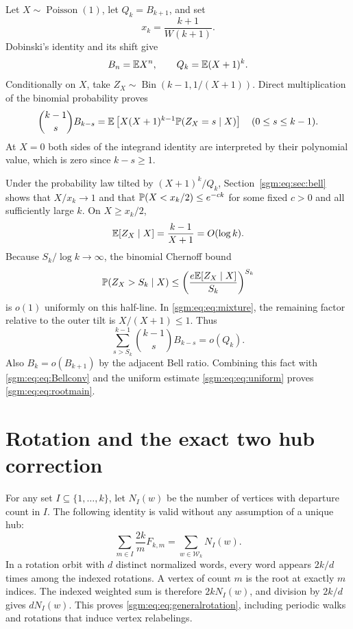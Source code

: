 \documentclass[11pt,letterpaper]{article}
\theoremstyle{remark}\newtheorem{remark}[theorem]{Remark}
\newcommand{\Wc}{\mathcal W}\newcommand{\Uc}{\mathcal U}\newcommand{\Part}{\operatorname{Part}}
\newcommand{\Poi}{\operatorname{Poisson}}\newcommand{\Bin}{\operatorname{Bin}}
\theoremstyle{definition}\newtheorem{definition}[theorem]{Definition}
\begin{document}
Let $X\sim\Poi(1)$, let $Q_k=B_{k+1}$, and set
\[
 x_k=\frac{k+1}{W(k+1)}.
\]
Dobinski's identity and its shift give
\begin{equation}\label{sgm:eq:eq:shifted}
 B_n=\mathbb E X^n,\qquad Q_k=\mathbb E(X+1)^k.
\end{equation}
Conditionally on $X$, take $Z_X\sim\Bin(k-1,1/(X+1))$. Direct multiplication of the binomial probability proves
\begin{equation}\label{sgm:eq:eq:mixture}
 \binom{k-1}{s}B_{k-s}
 =\mathbb E\left[X(X+1)^{k-1}\mathbb P(Z_X=s\mid X)\right]
 \quad(0\le s\le k-1).
\end{equation}
At $X=0$ both sides of the integrand identity are interpreted by their polynomial value, which is zero since $k-s\ge1$.

Under the probability law tilted by $(X+1)^k/Q_k$, Section~\ref{sgm:eq:sec:bell} shows that $X/x_k\to1$ and that $\mathbb P(X<x_k/2)\le e^{-c k}$ for some fixed $c>0$ and all sufficiently large $k$. On $X\ge x_k/2$,
\[
 \mathbb E[Z_X\mid X]=\frac{k-1}{X+1}=O(\log k).
\]
Because $S_k/\log k\to\infty$, the binomial Chernoff bound
\[
 \mathbb P(Z_X>S_k\mid X)
 \le\left(\frac{e\mathbb E[Z_X\mid X]}{S_k}\right)^{S_k}
\]
is $o(1)$ uniformly on this half-line. In \eqref{sgm:eq:eq:mixture}, the remaining factor relative to the outer tilt is $X/(X+1)\le1$. Thus
\[
 \sum_{s>S_k}^{k-1}\binom{k-1}{s}B_{k-s}=o(Q_k).
\]
Also $B_k=o(B_{k+1})$ by the adjacent Bell ratio. Combining this fact with \eqref{sgm:eq:eq:Bellconv} and the uniform estimate \eqref{sgm:eq:eq:uniform} proves \eqref{sgm:eq:eq:rootmain}.

\section{Rotation and the exact two hub correction}\label{sgm:eq:sec:rotation}
For any set $I\subseteq\{1,\ldots,k\}$, let $N_I(w)$ be the number of vertices with departure count in $I$. The following identity is valid without any assumption of a unique hub:
\begin{equation}\label{sgm:eq:eq:generalrotation}
 \sum_{m\in I}\frac{2k}{m}F_{k,m}=\sum_{w\in\Wc_k}N_I(w).
\end{equation}
In a rotation orbit with $d$ distinct normalized words, every word appears $2k/d$ times among the indexed rotations. A vertex of count $m$ is the root at exactly $m$ indices. The indexed weighted sum is therefore $2kN_I(w)$, and division by $2k/d$ gives $dN_I(w)$. This proves \eqref{sgm:eq:eq:generalrotation}, including periodic walks and rotations that induce vertex relabelings.
\end{document}
